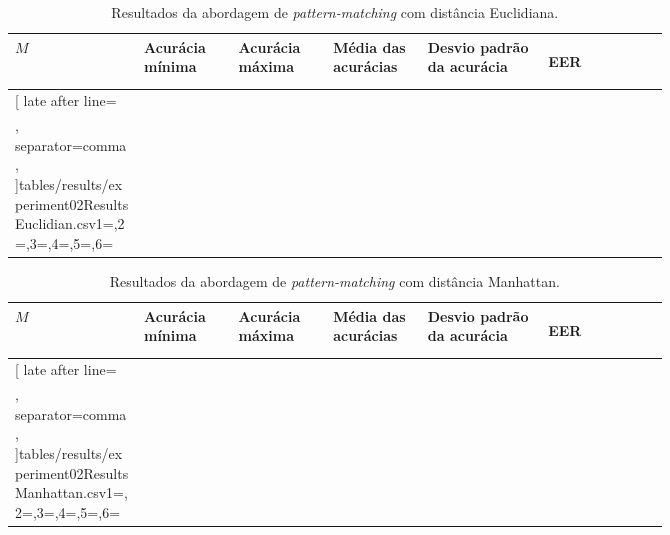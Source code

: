 \begin{table}[H]
	\newcommand{\mc}[3]{\multicolumn{#1}{#2}{#3}}
	\begin{center}
		\begin{tabular}{|p{0.15\linewidth}|p{0.11\linewidth}|p{0.11\linewidth}|p{0.11\linewidth}|p{0.14\linewidth}|p{0.14\linewidth}|}\hline
			\rowcolor{tcA}
			\centering\textbf{$M$} & \centering\textbf{Acurácia mínima} & \centering\textbf{Acurácia máxima} & \centering\textbf{Média das acurácias} & \centering\textbf{Desvio padrão da acurácia} & \begin{center}\textbf{EER}\end{center}\\\hline

			\rowcolor{tcB}
			\csvreader[
			late after line=\\\hline\rowcolor{tcB},%
			separator=comma,
			]{tables/results/experiment02ResultsEuclidian.csv}{1=\eme,2=\minAccu,3=\maxAccu,4=\meanAccu,5=\stdDev,6=\eer}{\centering\eme\% & \centering\minAccu & \centering\maxAccu & \centering\meanAccu & \centering\stdDev & \eer}

		\end{tabular}
	\end{center}
	\caption{Resultados da abordagem de \textit{pattern-matching} com distância Euclidiana.}
	\label{tab:experiment02ResultsEuclidian}
\end{table}

\begin{table}[H]
	\newcommand{\mc}[3]{\multicolumn{#1}{#2}{#3}}
	\begin{center}
		\begin{tabular}{|p{0.15\linewidth}|p{0.11\linewidth}|p{0.11\linewidth}|p{0.11\linewidth}|p{0.14\linewidth}|p{0.14\linewidth}|}\hline
			\rowcolor{tcA}
			\centering\textbf{$M$} & \centering\textbf{Acurácia mínima} & \centering\textbf{Acurácia máxima} & \centering\textbf{Média das acurácias} & \centering\textbf{Desvio padrão da acurácia} & \begin{center}\textbf{EER}\end{center}\\\hline
			
			\rowcolor{tcB}
			\csvreader[
			late after line=\\\hline\rowcolor{tcB},%
			separator=comma,
			]{tables/results/experiment02ResultsManhattan.csv}{1=\eme,2=\minAccu,3=\maxAccu,4=\meanAccu,5=\stdDev,6=\eer}{\centering\eme\% & \centering\minAccu & \centering\maxAccu & \centering\meanAccu & \centering\stdDev & \eer}
		\end{tabular}
	\end{center}
	\caption{Resultados da abordagem de \textit{pattern-matching} com distância Manhattan.}
	\label{tab:experiment02ResultsManhattan}
\end{table}